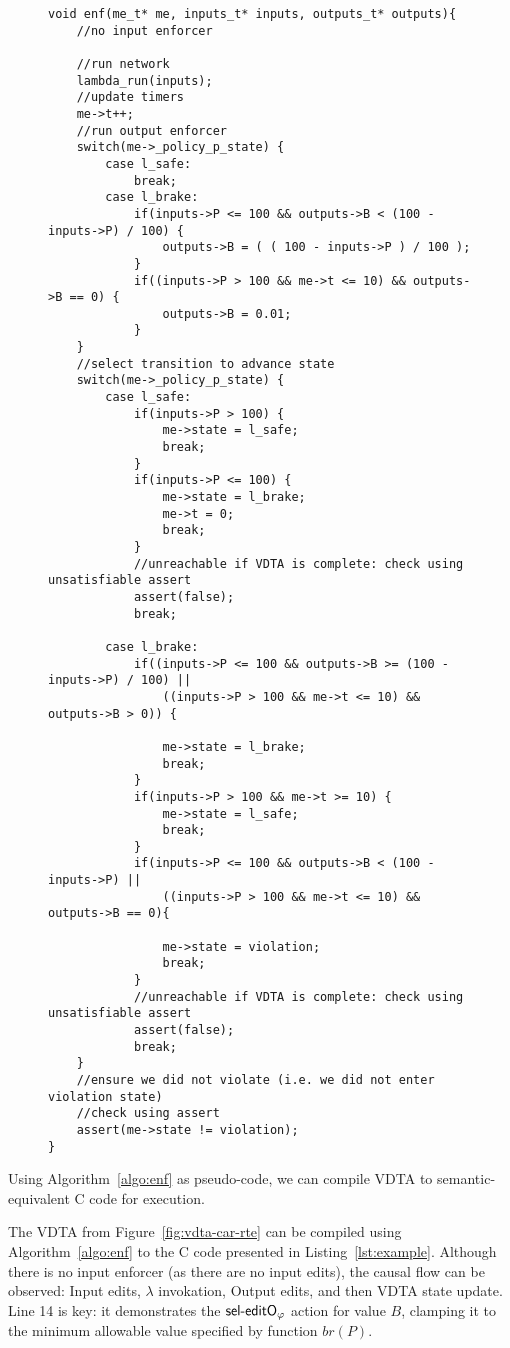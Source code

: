 \begin{figure}[b]
	\vspace{-5mm}
	\begin{lstlisting}[caption={Example compiled enforcer for VDTA in Figure~\ref{fig:vdta-car-rte}},label={lst:example}]
void enf(me_t* me, inputs_t* inputs, outputs_t* outputs){
	//no input enforcer
	
	//run network
	lambda_run(inputs);	
	//update timers
	me->t++;	
	//run output enforcer
	switch(me->_policy_p_state) {
		case l_safe:
			break;
		case l_brake:
			if(inputs->P <= 100 && outputs->B < (100 - inputs->P) / 100) {
				outputs->B = ( ( 100 - inputs->P ) / 100 );
			} 
			if((inputs->P > 100 && me->t <= 10) && outputs->B == 0) {
				outputs->B = 0.01;
			}	
	}
	//select transition to advance state
	switch(me->_policy_p_state) {
		case l_safe:
			if(inputs->P > 100) {
				me->state = l_safe;
				break;
			} 
			if(inputs->P <= 100) {
				me->state = l_brake;
				me->t = 0;
				break;
			} 
			//unreachable if VDTA is complete: check using unsatisfiable assert
			assert(false);
			break;
	
		case l_brake:
			if((inputs->P <= 100 && outputs->B >= (100 - inputs->P) / 100) || 
				((inputs->P > 100 && me->t <= 10) && outputs->B > 0)) {
				
				me->state = l_brake;
				break;
			} 
			if(inputs->P > 100 && me->t >= 10) {
				me->state = l_safe;
				break;
			} 
			if(inputs->P <= 100 && outputs->B < (100 - inputs->P) || 
				((inputs->P > 100 && me->t <= 10) && outputs->B == 0){
				
				me->state = violation;
				break;
			} 
			//unreachable if VDTA is complete: check using unsatisfiable assert
			assert(false);
			break;
	}
	//ensure we did not violate (i.e. we did not enter violation state)
	//check using assert
	assert(me->state != violation);
}\end{lstlisting}
	\vspace{-5mm}
\end{figure}



Using Algorithm~\ref{algo:enf} as pseudo-code, we can compile \ac{VDTA} to semantic-equivalent C code for execution.


\begin{example}
	The \ac{VDTA} from Figure~\ref{fig:vdta-car-rte} can be compiled using Algorithm~\ref{algo:enf} to the C code presented in Listing~\ref{lst:example}.
	Although there is no input enforcer (as there are no input edits), the causal flow can be observed: Input edits, $\lambda$ invokation, Output edits, and then \ac{VDTA} state update.
	Line 14 is key: it demonstrates the $\mathsf{{sel}\mbox{-} editO_{\varphi}}$ action for value $B$, clamping it to the minimum allowable value specified by function $br\left(P\right)$.
\end{example}

